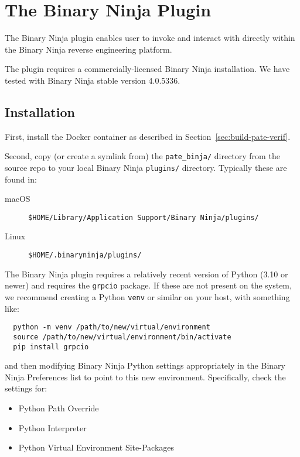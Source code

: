\section{The \pate{} Binary Ninja Plugin}
\label{sec:binary-ninja-ui}

The \pate{} Binary Ninja plugin enables user to invoke and interact with \pate{} directly within the Binary Ninja reverse engineering platform.

The \pate{} plugin requires a commercially-licensed Binary Ninja installation.
We have tested \pate{} with Binary Ninja stable version 4.0.5336.

\subsection{Installation}

First, install the \pate{} Docker container as described in Section~\ref{sec:build-pate-verif}.

Second, copy (or create a symlink from) the \texttt{pate\_binja/} directory from the \pate{} source repo to your local Binary Ninja \texttt{plugins/} directory. Typically these are found in:
\begin{description}
\item[macOS] \texttt{\$HOME/Library/Application Support/Binary Ninja/plugins/}
\item[Linux] \texttt{\$HOME/.binaryninja/plugins/}
\end{description}

The Binary Ninja plugin requires a relatively recent version of Python (3.10 or newer) and requires the \texttt{grpcio} package.
If these are not present on the system, we recommend creating a Python \texttt{venv} or similar on your host, with something like:

\begin{verbatim}
  python -m venv /path/to/new/virtual/environment
  source /path/to/new/virtual/environment/bin/activate
  pip install grpcio
\end{verbatim}

and then modifying Binary Ninja Python settings appropriately in the Binary Ninja Preferences list to point to this new environment.
Specifically, check the settings for:

\begin{itemize}
    \item Python Path Override
    \item Python Interpreter
    \item Python Virtual Environment Site-Packages
\end{itemize}

